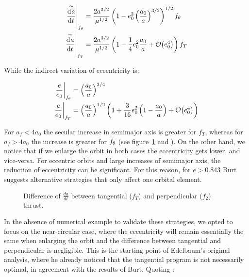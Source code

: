 \begin{align*}
\left. \secular{\deriv{a}{t}} \right|_{f_{\ta}} & = \frac{2 a^{3/2}}{\mu^{1/2}} \left( 1 - e_0^2 \left( \frac{a_0}{a} \right)^{3/2} \right)^{1/2} f_{\ta} \\
%
\left. \secular{\deriv{a}{t}} \right|_{f_T} & = \frac{2 a^{3/2}}{\mu^{1/2}} \left( 1 - \frac{1}{4} e_0^2 \frac{a_0}{a} + \bigO{e_0^4} \right) f_T
\end{align*}

While the indirect variation of eccentricity is:

\begin{align*}
\left. \frac{e}{e_0} \right|_{f_{\ta}} & = \left( \frac{a_0}{a} \right)^{3/4} \\
%
\left. \frac{e}{e_0} \right|_{f_T} & = \left( \frac{a_0}{a} \right)^{1/2} \left( 1 + \frac{3}{16} e_0^2 \left( 1 - \frac{a_0}{a} \right) + \bigO{e_0^4} \right) \\
\end{align*}

For $a_f < 4 a_0$ the secular increase in semimajor axis is greater for $f_T$, whereas for $a_f > 4 a_0$ the increase is greater for $f_{\theta}$ (see figure~\ref{fig:burtdiff} and \cite{burt1967space}). On the other hand, we notice that if we enlarge the orbit in both cases the eccentricity gets lower, and vice-versa. For eccentric orbits and large increases of semimajor axis, the reduction of eccentricity can be significant. For this reason, for $e > 0.843$ Burt suggests alternative strategies that only affect one orbital element.

\begin{figure}%
  \centering
  \resizebox{0.8\textwidth}{!}
  {
  
  }
  \caption{Difference of $\frac{da}{dt}$ between tangential ($f_T$) and perpendicular ($f_2$) thrust.}
  \label{fig:burtdiff}
\end{figure}

In the absence of numerical example to validate these strategies, we opted to focus on the near-circular case, where the eccentricity will remain essentially the same when enlarging the orbit and the difference between tangential and perpendicular is negligible. This is the starting point of Edelbaum's original analysis, where he already noticed that the tangential program is not necessarily optimal, in agreement with the results of Burt. Quoting \cite{edelbaum1961propulsion}:
% 
% 
%
%

